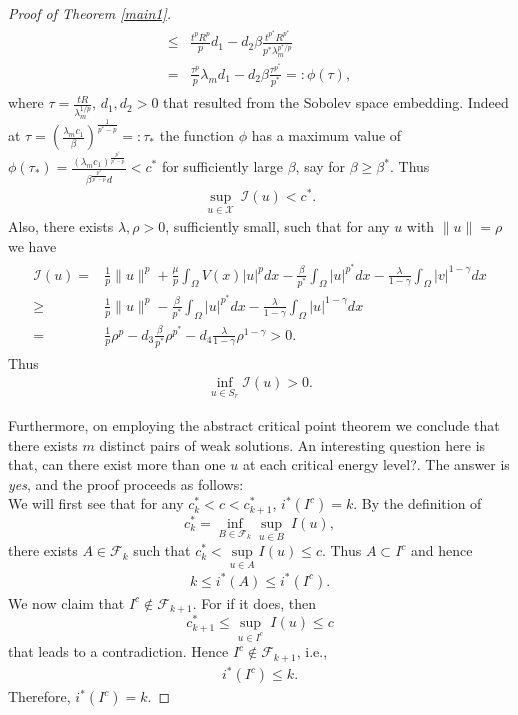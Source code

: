 \documentclass[12pt]{extarticle}
\theoremstyle{definition}
\theoremstyle{remark}
\theoremstyle{definition}
\numberwithin{equation}{section}
\numberwithin{equation}{section}
\begin{document}
\begin{proof}[Proof of Theorem \ref{main1}]
\begin{align}
\begin{split}
	\leq & \frac{t^pR^p}{p}d_1-d_2\beta\frac{t^{p^*}R^{p^*}}{p^*\lambda_m^{p^*/p}}\\
	=& \frac{\tau^p}{p}\lambda_m d_1-d_2\beta\frac{\tau^{p^*}}{p^*}=:\phi(\tau),
		\end{split}
	\end{align}
	where $\tau=\frac{tR}{\lambda_m^{1/p}}$, $d_1, d_2>0$ that resulted from the Sobolev space embedding. Indeed at $\tau=\left(\frac{\lambda_mc_1}{\beta}\right)^{\frac{1}{p^*-p}}=:\tau_*$ the function $\phi$ has a maximum value of $\phi(\tau_*)=\frac{(\lambda_mc_1)^{\frac{p^*}{p^*-p}}}{\beta^{\frac{p^*}{p^*-p}}d}<c^*$ for sufficiently large $\beta$, say for $\beta\geq\beta^*$. Thus \begin{align}\label{hyp2}\underset{u\in\mathcal{X}}\sup~\mathcal{I}(u)< c^*.\end{align}
	Also, there exists $\lambda, \rho>0$, sufficiently small, such that for any $u$ with $\|u\|=\rho$ we have
	\begin{align}\label{eq2'}
	\begin{split}
	\mathcal{I}(u)=&\frac{1}{p}\|u\|^p+\frac{\mu}{p}\int_{\Omega}V(x)|u|^pdx-\frac{\beta}{p^*}\int_{\Omega}|u|^{p^*}dx-\frac{\lambda}{1-\gamma}\int_{\Omega}|v|^{1-\gamma}dx\\
	\geq & \frac{1}{p}\|u\|^p-\frac{\beta}{p^*}\int_{\Omega}|u|^{p^*}dx-\frac{\lambda}{1-\gamma}\int_{\Omega}|u|^{1-\gamma}dx\\
	=&\frac{1}{p}\rho^p-d_3\frac{\beta}{p^*}\rho^{p^*}-d_4\frac{\lambda}{1-\gamma}\rho^{1-\gamma}>0.
	\end{split}
	\end{align}
Thus \begin{align}\label{hyp3}\underset{u\in S_r}\inf\mathcal{I}(u)>0.\end{align}

Furthermore, on employing the abstract critical point theorem we conclude that there exists $m$ distinct pairs of weak solutions. An interesting question here is that, can there exist more than one $u$ at each critical energy level?. The answer is {\it yes}, and the proof proceeds as follows:\\ We will first see that for any $c_k^*<c<c_{k+1}^*$, $i^*(I^{c})=k$. By the definition of $$c_k^*=\underset{B\in\mathcal{F}_k}\inf\underset{u\in B}\sup~I(u),$$
there exists $A\in \mathcal{F}_k$ such that $c_k^*<\underset{u\in A}\sup I(u)\leq c$. Thus $A\subset I^c$ and hence \begin{align}\label{index1}k\leq i^*(A)\leq i^*(I^c).\end{align}
We now claim that $I^c\notin \mathcal{F}_{k+1}$. For if it does, then $$c_{k+1}^*\leq \underset{u\in I^c}\sup~I(u)\leq c$$
that leads to a contradiction. Hence $I^c\notin \mathcal{F}_{k+1}$, i.e., \begin{align}\label{index2}i^*(I^c)\leq k.\end{align}
Therefore, $i^*(I^c)=k$.


\end{proof}
\end{document}
